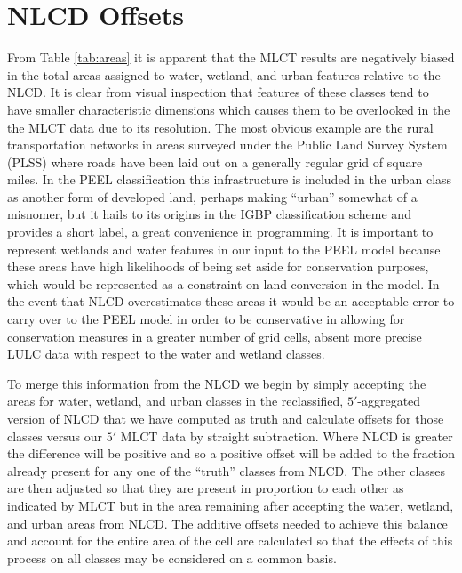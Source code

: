 \section{NLCD Offsets}
\label{sec:nlcd_offsets}


From Table \ref{tab:areas} it is apparent that the MLCT results are
negatively biased in the total areas assigned to water, wetland, and
urban features relative to the NLCD.  It is clear from visual
inspection that features of these classes tend to have smaller
characteristic dimensions which causes them to be overlooked in the
the MLCT data due to its resolution.  The most obvious example are the
rural transportation networks in areas surveyed under the Public Land
Survey System (PLSS) where roads have been laid out on a generally
regular grid of square miles.  In the PEEL classification this
infrastructure is included in the urban class as another form of
developed land, perhaps making ``urban'' somewhat of a misnomer, but
it hails to its origins in the IGBP classification scheme and provides
a short label, a great convenience in programming.  It is important to
represent wetlands and water features in our input to the PEEL model
because these areas have high likelihoods of being set aside for
conservation purposes, which would be represented as a constraint on
land conversion in the model.  In the event that NLCD overestimates
these areas it would be an acceptable error to carry over to the PEEL
model in order to be conservative in allowing for conservation
measures in a greater number of grid cells, absent more precise LULC
data with respect to the water and wetland classes.

To merge this information from the NLCD we begin by simply accepting
the areas for water, wetland, and urban classes in the reclassified,
$5'$-aggregated version of NLCD that we have computed as truth and
calculate offsets for those classes versus our $5'$ MLCT data by
straight subtraction.  Where NLCD is greater the difference will be
positive and so a positive offset will be added to the fraction
already present for any one of the ``truth'' classes from NLCD.  The
other classes are then adjusted so that they are present in proportion
to each other as indicated by MLCT but in the area remaining after
accepting the water, wetland, and urban areas from NLCD.  The additive
offsets needed to achieve this balance and account for the entire area
of the cell are calculated so that the effects of this process on all
classes may be considered on a common basis.  

